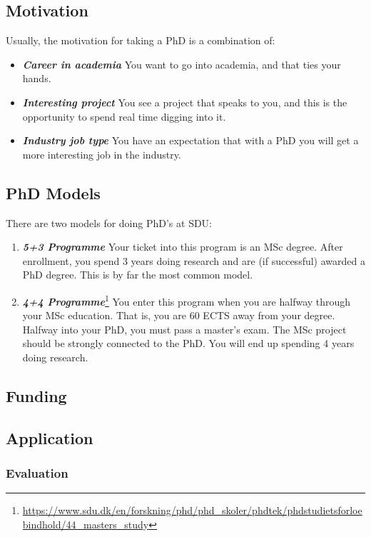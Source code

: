 \documentclass[a4paper, oneside]{memoir}
\newcommand{\textdesc}[1]{\textit{\textbf{#1}}}
\newcommand{\descitem}[1]{\item \textdesc{#1}}
\newcommand{\idx}[1]{\index{#1}\marginpar{\raggedright \tiny #1}}
\begin{document}
\subsection{Motivation}

\idx{Motivation}Usually, the motivation for taking a PhD is a combination of:
\begin{itemize}
  \descitem{Career in academia} You want to go into academia, and that ties your hands.
  \descitem{Interesting project} You see a project that speaks to you, and this is the opportunity to spend real time digging into it.
  \descitem{Industry job type} You have an expectation that with a PhD you will get a more interesting job in the industry.
\end{itemize}

\subsection{PhD Models}

There are two models for doing PhD's at SDU:
\begin{enumerate}
  \descitem{5+3 Programme} Your ticket into this program is an MSc degree. After enrollment, you spend 3 years doing research and are (if successful) awarded a PhD degree. This is by far the most common model.
  \descitem{4+4 Programme}\footnote{\url{https://www.sdu.dk/en/forskning/phd/phd_skoler/phdtek/phdstudietsforloebindhold/44_masters_study}} You enter this program when you are halfway through your MSc education. That is, you are 60 ECTS away from your degree. Halfway into your PhD, you must pass a master's exam. The MSc project should be strongly connected to the PhD. You will end up spending 4 years doing research.
\end{enumerate}

\subsection{Funding}




\subsection{Application}

\subsubsection{Evaluation}
\end{document}
